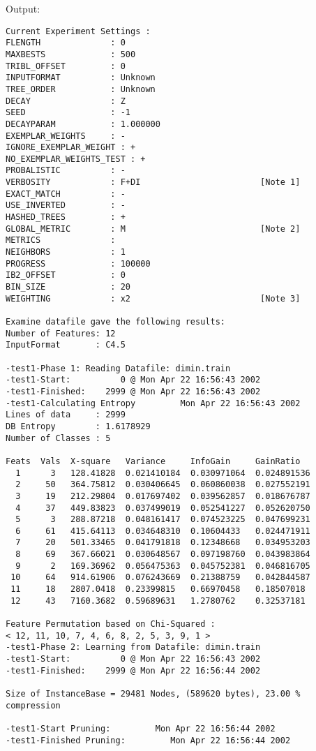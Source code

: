 \documentclass{article}
\begin{document}
Output:
\begin{verbatim}
Current Experiment Settings :
FLENGTH              : 0
MAXBESTS             : 500
TRIBL_OFFSET         : 0
INPUTFORMAT          : Unknown
TREE_ORDER           : Unknown
DECAY                : Z
SEED                 : -1
DECAYPARAM           : 1.000000
EXEMPLAR_WEIGHTS     : -
IGNORE_EXEMPLAR_WEIGHT : +
NO_EXEMPLAR_WEIGHTS_TEST : +
PROBALISTIC          : -
VERBOSITY            : F+DI                        [Note 1]
EXACT_MATCH          : -
USE_INVERTED         : -
HASHED_TREES         : +
GLOBAL_METRIC        : M                           [Note 2]
METRICS              : 
NEIGHBORS            : 1
PROGRESS             : 100000
IB2_OFFSET           : 0
BIN_SIZE             : 20
WEIGHTING            : x2                          [Note 3]

Examine datafile gave the following results:
Number of Features: 12
InputFormat       : C4.5

-test1-Phase 1: Reading Datafile: dimin.train
-test1-Start:          0 @ Mon Apr 22 16:56:43 2002
-test1-Finished:    2999 @ Mon Apr 22 16:56:43 2002
-test1-Calculating Entropy         Mon Apr 22 16:56:43 2002
Lines of data     : 2999
DB Entropy        : 1.6178929
Number of Classes : 5

Feats  Vals  X-square   Variance     InfoGain     GainRatio
  1      3   128.41828  0.021410184  0.030971064  0.024891536
  2     50   364.75812  0.030406645  0.060860038  0.027552191
  3     19   212.29804  0.017697402  0.039562857  0.018676787
  4     37   449.83823  0.037499019  0.052541227  0.052620750
  5      3   288.87218  0.048161417  0.074523225  0.047699231
  6     61   415.64113  0.034648310  0.10604433   0.024471911
  7     20   501.33465  0.041791818  0.12348668   0.034953203
  8     69   367.66021  0.030648567  0.097198760  0.043983864
  9      2   169.36962  0.056475363  0.045752381  0.046816705
 10     64   914.61906  0.076243669  0.21388759   0.042844587
 11     18   2807.0418  0.23399815   0.66970458   0.18507018
 12     43   7160.3682  0.59689631   1.2780762    0.32537181

Feature Permutation based on Chi-Squared :
< 12, 11, 10, 7, 4, 6, 8, 2, 5, 3, 9, 1 >
-test1-Phase 2: Learning from Datafile: dimin.train
-test1-Start:          0 @ Mon Apr 22 16:56:43 2002
-test1-Finished:    2999 @ Mon Apr 22 16:56:44 2002

Size of InstanceBase = 29481 Nodes, (589620 bytes), 23.00 % compression

-test1-Start Pruning:         Mon Apr 22 16:56:44 2002
-test1-Finished Pruning:         Mon Apr 22 16:56:44 2002


\end{verbatim}
\end{document}
